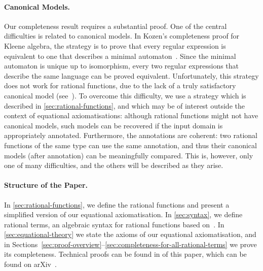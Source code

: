 \paragraph*{Canonical Models.} Our completeness result requires a substantial proof. One of the central difficulties is related to canonical models. In Kozen's completeness proof for Kleene algebra, the strategy is to prove that every  regular expression is equivalent to one  that describes a minimal automaton~\cite[Lemma 5.4]{Kozen1994}. Since the minimal automaton is unique up to isomorphism, every two regular expressions that describe the same language can be proved equivalent. Unfortunately, this strategy does not work for rational functions, due to the lack of a truly satisfactory canonical model (see~\cite[Section 4]{Filiot2018}). To overcome this difficulty, we use a strategy which is described in \cref{sec:rational-functions}, and which may be of interest outside the context of equational axiomatisations: although rational functions might not have canonical models, such models can be recovered if the input domain is appropriately annotated. Furthermore, the annotations are coherent: two rational functions of the same type can use the same annotation, and thus their canonical models (after annotation) can be meaningfully compared. This is, however, only one of many difficulties, and the others will be described as they arise.

\paragraph*{Structure of the Paper.} In \cref{sec:rational-functions}, we define the rational functions and present a simplified version of our equational axiomatisation. In \cref{sec:syntax}, we define rational terms, an algebraic syntax for rational functions based on~\cite{BojanczykDaviaudKrishna2018}. In \cref{sec:equational-theory} we state the axioms of our equational axiomatisation, and in Sections~\ref{sec:proof-overview}--\ref{sec:completeness-for-all-rational-terms} we prove its completeness. Technical proofs can be found in \appendixplace\iffullversion\else{} of this paper, which can be found on arXiv~\cite{fullversion}\fi.